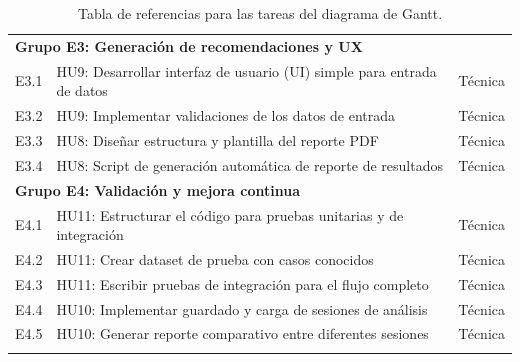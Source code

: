 \documentclass[
11pt, %
]{charter}
\begin{document}
\begin{longtable}{lp{10cm}l}
\multicolumn{3}{l}{\textbf{Grupo E3: Generación de recomendaciones y UX}} \\
E3.1 & HU9: Desarrollar interfaz de usuario (UI) simple para entrada de datos & Técnica \\
E3.2 & HU9: Implementar validaciones de los datos de entrada & Técnica \\
E3.3 & HU8: Diseñar estructura y plantilla del reporte PDF & Técnica \\
E3.4 & HU8: Script de generación automática de reporte de resultados & Técnica \\
\midrule

\multicolumn{3}{l}{\textbf{Grupo E4: Validación y mejora continua}} \\
E4.1 & HU11: Estructurar el código para pruebas unitarias y de integración & Técnica \\
E4.2 & HU11: Crear dataset de prueba con casos conocidos & Técnica \\
E4.3 & HU11: Escribir pruebas de integración para el flujo completo & Técnica \\
E4.4 & HU10: Implementar guardado y carga de sesiones de análisis & Técnica \\
E4.5 & HU10: Generar reporte comparativo entre diferentes sesiones & Técnica \\

\bottomrule
\caption{Tabla de referencias para las tareas del diagrama de Gantt.}
\label{tab:gantt_ref}
\end{longtable}
\end{document}
